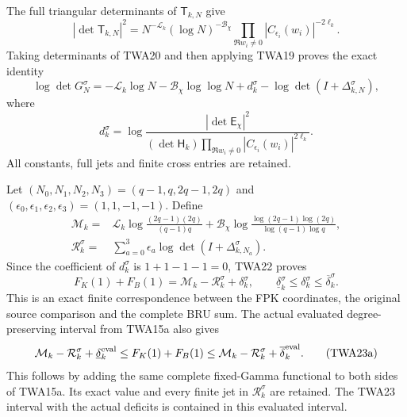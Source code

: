 The full triangular determinants of $\mathsf T_{k,N}$ give
\[
|\det\mathsf T_{k,N}|^2
=N^{-\mathcal L_k}(\log N)^{-\mathcal B_\chi}
 \prod_{\Re w_i\ne0}|C_{\epsilon_i}(w_i)|^{-2\ell_k}.
\]
Taking determinants of TWA20 and then applying TWA19 proves
the exact identity
\[
\log\det G_N^\sigma
=-\mathcal L_k\log N-\mathcal B_\chi\log\log N
 +d_k^\sigma-\log\det(I+\Delta_{k,N}^\sigma),
\tag{TWA22}
\]
where
\[
d_k^\sigma=\log\frac{|\det\mathsf E_\chi|^2}
{(\det\mathsf H_k)
 \prod_{\Re w_i\ne0}|C_{\epsilon_i}(w_i)|^{2\ell_k}}.
\]
All constants, full jets and finite cross entries are retained.

Let $(N_0,N_1,N_2,N_3)=(q-1,q,2q-1,2q)$ and
$(\epsilon_0,\epsilon_1,\epsilon_2,\epsilon_3)=(1,1,-1,-1)$.
Define
\[
\begin{aligned}
\mathcal M_k={}&\mathcal L_k
 \log\frac{(2q-1)(2q)}{(q-1)q}
 +\mathcal B_\chi
 \log\frac{\log(2q-1)\log(2q)}{\log(q-1)\log q},\\
\mathcal R_k^\sigma={}&\sum_{a=0}^3\epsilon_a
                         \log\det(I+\Delta_{k,N_a}^\sigma).
\end{aligned}
\]
Since the coefficient of $d_k^\sigma$ is $1+1-1-1=0$,
TWA22 proves
\[
\boxed{F_K(1)+F_B(1)
=\mathcal M_k-\mathcal R_k^\sigma+\delta_k^\sigma,
\qquad
\underline\delta_k^\sigma\leq\delta_k^\sigma
                         \leq\overline\delta_k^\sigma.}
\tag{TWA23}
\]
This is an exact finite correspondence between the FPK coordinates,
the original source comparison and the complete BRU sum. The actual
evaluated degree-preserving interval from TWA15a also gives
\[
 \mathcal M_k-\mathcal R_k^\sigma+\underline\delta_k^{\rm eval}
 \leq F_K(1)+F_B(1)
 \leq\mathcal M_k-\mathcal R_k^\sigma+\overline\delta_k^{\rm eval}.
 \tag{TWA23a}
\]
This follows by adding the same complete fixed-Gamma functional
to both sides of TWA15a. Its exact value and every finite jet
in $\mathcal R_k^\sigma$ are retained. The TWA23 interval with
the actual deficits is contained in this evaluated interval.

